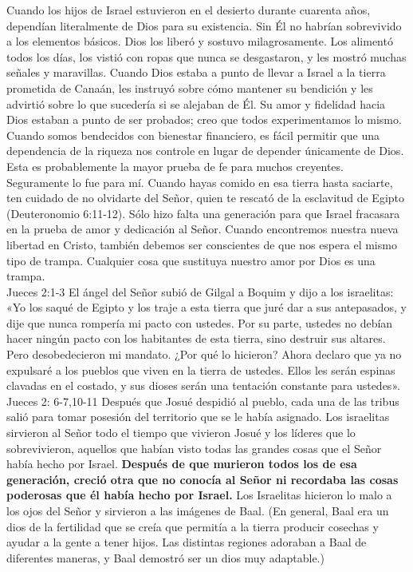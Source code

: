 \documentclass[twoside, 12pt]{book}
\begin{document}
Cuando los hijos de Israel estuvieron en el desierto durante cuarenta años, dependían literalmente de Dios para su existencia. Sin Él no habrían sobrevivido a los elementos básicos. Dios los liberó y sostuvo milagrosamente. Los alimentó todos los días, los vistió con ropas que nunca se desgastaron, y les mostró muchas señales y maravillas. Cuando Dios estaba a punto de llevar a Israel a la tierra prometida de Canaán, les instruyó sobre cómo mantener su bendición y les advirtió sobre lo que sucedería si se alejaban de Él. Su amor y fidelidad hacia Dios estaban a punto de ser probados; creo que todos experimentamos lo mismo. Cuando somos bendecidos con bienestar financiero, es fácil permitir que una dependencia de la riqueza nos controle en lugar de depender únicamente de Dios. Esta es probablemente la mayor prueba de fe para muchos creyentes. Seguramente lo fue para mí. Cuando hayas comido en esa tierra hasta saciarte, ten cuidado de no olvidarte del Señor, quien te rescató de la esclavitud de Egipto (Deuteronomio 6:11-12). Sólo hizo falta una generación para que Israel fracasara en la prueba de amor y dedicación al Señor. Cuando encontremos nuestra nueva libertad en Cristo, también debemos ser conscientes de que nos espera el mismo tipo de trampa. Cualquier cosa que sustituya nuestro amor por Dios es una trampa.\\
     	
Jueces 2:1-3 El ángel del Señor subió de Gilgal a Boquim y dijo a los israelitas: «Yo los saqué de Egipto y los traje a esta tierra que juré dar a sus antepasados, y dije que nunca rompería mi pacto con ustedes. Por su parte, ustedes no debían hacer ningún pacto con los habitantes de esta tierra, sino destruir sus altares. Pero desobedecieron mi mandato. ¿Por qué lo hicieron? Ahora declaro que ya no expulsaré a los pueblos que viven en la tierra de ustedes. Ellos les serán espinas clavadas en el costado, y sus dioses serán una tentación constante para ustedes».\\

Jueces 2: 6-7,10-11 Después que Josué despidió al pueblo, cada una de las tribus salió para tomar posesión del territorio que se le había asignado. Los israelitas sirvieron al Señor todo el tiempo que vivieron Josué y los líderes que lo sobrevivieron, aquellos que habían visto todas las grandes cosas que el Señor había hecho por Israel. \textbf{Después de que murieron todos los de esa generación, creció otra que no conocía al Señor ni recordaba las cosas poderosas que él había hecho por Israel.} Los Israelitas hicieron lo malo a los ojos del Señor y sirvieron a las imágenes de Baal. (En general, Baal era un dios de la fertilidad que se creía que permitía a la tierra producir cosechas y ayudar a la gente a tener hijos. Las distintas regiones adoraban a Baal de diferentes maneras, y Baal demostró ser un dios muy adaptable.)\\
\end{document}

